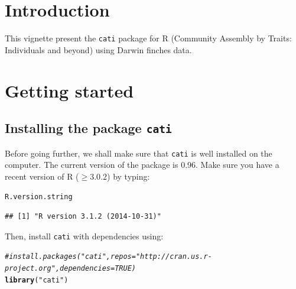 \documentclass[12pt]{article}\usepackage[]{graphicx}\usepackage[]{color}
\makeatletter
\newcommand{\hlstr}[1]{\textcolor[rgb]{0.192,0.494,0.8}{#1}}%
\newcommand{\hlcom}[1]{\textcolor[rgb]{0.678,0.584,0.686}{\textit{#1}}}%
\newcommand{\hlstd}[1]{\textcolor[rgb]{0.345,0.345,0.345}{#1}}%
\newcommand{\hlkwd}[1]{\textcolor[rgb]{0.737,0.353,0.396}{\textbf{#1}}}%
\newenvironment{kframe}{%
 \def\at@end@of@kframe{}%
 \ifinner\ifhmode%
  \def\at@end@of@kframe{\end{minipage}}%
  \begin{minipage}{\columnwidth}%
 \fi\fi%
 \def\FrameCommand##1{\hskip\@totalleftmargin \hskip-\fboxsep
 \colorbox{shadecolor}{##1}\hskip-\fboxsep
     \hskip-\linewidth \hskip-\@totalleftmargin \hskip\columnwidth}%
 \MakeFramed {\advance\hsize-\width
   \@totalleftmargin\z@ \linewidth\hsize
   \@setminipage}}%
 {\par\unskip\endMakeFramed%
 \at@end@of@kframe}
\newenvironment{knitrout}{}{} %
\makeatother
\begin{document}
\newpage


\section{Introduction}
This vignette present the \texttt{cati} package for R (Community Assembly by Traits: Individuals and beyond) using Darwin finches data.

\section{Getting started}
\subsection{Installing the package \texttt{cati}}

Before going further, we shall make sure that \texttt{cati} is well installed
on the computer.
The current version of the package is 0.96.
Make sure you have a recent version of R ($\geq 3.0.2$) by typing:

\begin{knitrout}
\color{fgcolor}\begin{kframe}
\begin{alltt}
\hlstd{R.version.string}
\end{alltt}
\begin{verbatim}
## [1] "R version 3.1.2 (2014-10-31)"
\end{verbatim}
\end{kframe}
\end{knitrout}

Then, install \texttt{cati} with dependencies using:
\begin{knitrout}
\color{fgcolor}\begin{kframe}
\begin{alltt}
\hlcom{#install.packages("cati", repos = "http://cran.us.r-project.org", dependencies = TRUE)}
\hlkwd{library}\hlstd{(}\hlstr{"cati"}\hlstd{)}
\end{alltt}


{\ttfamily\noindent\itshape\color{messagecolor}{\#\# Loading required package: nlme\\\#\# Loading required package: ade4\\\#\# Loading required package: ape}}\end{kframe}
\end{knitrout}
\end{document}
